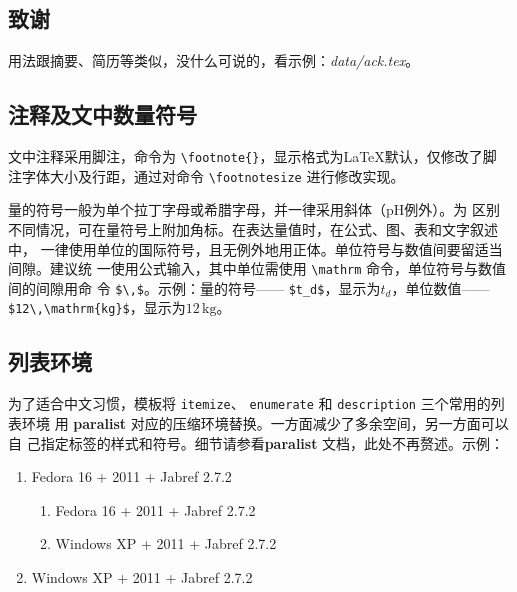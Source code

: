 \subsection*{致谢}

用法跟摘要、简历等类似，没什么可说的，看示例：\emph{data/ack.tex}。

\subsection*{注释及文中数量符号}

文中注释采用脚注，命令为 \verb|\footnote{}|，显示格式为\LaTeX{}默认，仅修改了脚
注字体大小及行距，通过对命令 \verb|\footnotesize| 进行修改实现。

量的符号一般为单个拉丁字母或希腊字母，并一律采用斜体（$\mathrm{pH}$例外）。为
区别不同情况，可在量符号上附加角标。在表达量值时，在公式、图、表和文字叙述中，
一律使用单位的国际符号，且无例外地用正体。单位符号与数值间要留适当间隙。建议统
一使用公式输入，其中单位需使用 \verb|\mathrm| 命令，单位符号与数值间的间隙用命
令 \verb|$\,$|。示例：量的符号—— \verb|$t_d$|，显示为$t_d$，单位数值——
\verb|$12\,\mathrm{kg}$|，显示为$12\,\mathrm{kg}$。

\subsection*{列表环境}

为了适合中文习惯，模板将 \texttt{itemize}、 \texttt{enumerate} 和
\texttt{description} 三个常用的列表环境
用 \textbf{paralist} 对应的压缩环境替换。一方面减少了多余空间，另一方面可以自
己指定标签的样式和符号。细节请参看\textbf{paralist} 文档，此处不再赘述。示例：
\begin{enumerate}
\item Fedora 16 + \TeXLive{} 2011 + Jabref 2.7.2
  \begin{enumerate}
    \item Fedora 16 + \TeXLive{} 2011 + Jabref 2.7.2
    \item Windows XP + \TeXLive{} 2011 + Jabref 2.7.2
  \end{enumerate}
\item Windows XP + \TeXLive{} 2011 + Jabref 2.7.2
\end{enumerate}
